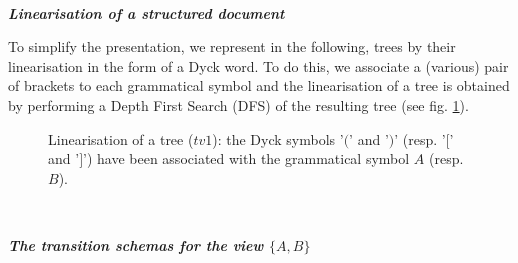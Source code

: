 
~

\noindent\textbf{\textit{Linearisation of a structured document}}

To simplify the presentation, we represent in the following, trees by their linearisation in the form of a Dyck word. To do this, we associate a (various) pair of brackets to each grammatical symbol and the linearisation of a tree is obtained by performing a Depth First Search (DFS) of the resulting tree (see fig. \ref{chap2:fig:tree-linearisation}).
\begin{figure}[ht!]
	\noindent
	\caption{Linearisation of a tree ($tv1$): the Dyck symbols '$($' and '$)$' (resp. '$[$' and '$]$') have been associated with the grammatical symbol $A$ (resp. $B$).}
	\label{chap2:fig:tree-linearisation}
\end{figure}


~

\noindent\textbf{\textit{The transition schemas for the view $\{A, B\}$}}

